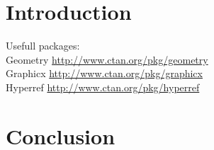 \documentclass{article}
\title{}
\author{Davide Grimaldi}
\date{}
\begin{document}
    \maketitle
    \section{Introduction}
        Usefull packages:\\
        Geometry \url{http://www.ctan.org/pkg/geometry} \\
        Graphicx \url{http://www.ctan.org/pkg/graphicx} \\
        Hyperref \url{http://www.ctan.org/pkg/hyperref} \\

    \section{Conclusion}
\end{document}
